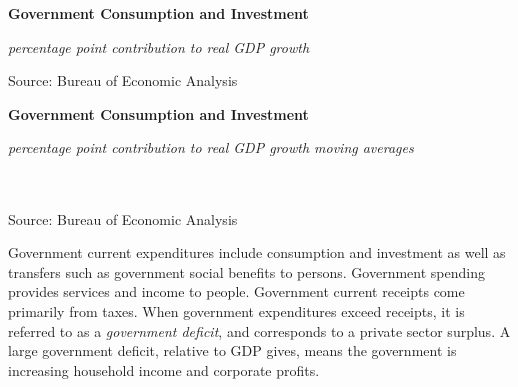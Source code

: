 \documentclass{report}
\makeatletter
\newcommand{\tbllink}[1]{\href{https://raw.githubusercontent.com/bdecon/US-chartbook/master/chartbook/data/#1}{\faTable}}
\newcommand*\short[1]{\expandafter\@gobbletwo\number\numexpr#1\relax}
\newcommand{\sbar}[4]{
		\addplot[ybar stacked, bar width=2.6pt, draw opacity=0, fill=#1] 
			table [x=#2, y=#3, col sep=comma]{#4};}
\newcommand{\dateaxisticks}{
		date coordinates in=x, axis line style={draw=none},
		xmax={2020-10-01},
		max space between ticks=40,	    
		xtick={{1990-01-01}, {1992-01-01}, {1994-01-01}, 
			{1996-01-01}, {1998-01-01}, {2000-01-01}, 
			{2002-01-01}, {2004-01-01}, {2006-01-01},
			{2008-01-01}, {2010-01-01}, {2012-01-01}, {2014-01-01},
		    {2016-01-01}, {2018-01-01}, {2020-01-01}},
		minor xtick={{1989-01-01}, {1991-01-01}, {1993-01-01},
			{1995-01-01}, {1997-01-01}, {1999-01-01}, 
			{2001-01-01}, {2003-01-01}, {2005-01-01}, {2007-01-01},
		    {2009-01-01}, {2011-01-01}, {2013-01-01}, {2015-01-01},
		    {2017-01-01}, {2019-01-01}},
		enlarge y limits={0.06}, enlarge x limits={0.01},
		}
\newcommand{\bbar}[2]{extra #1 ticks = {{#2}}, extra #1 tick labels = ,
		extra #1 tick style = {grid=major, grid style={thick, black!25}},}
\newcommand{\rbars}{
		\fill[color=black!10] (axis cs:{1990-07-01},\pgfkeysvalueof{/pgfplots/ymin}) rectangle 
			(axis cs:{1991-03-01}, \pgfkeysvalueof{/pgfplots/ymax});
		\fill[color=black!10] (axis cs:{2007-12-01},\pgfkeysvalueof{/pgfplots/ymin}) rectangle 
			(axis cs:{2009-07-01}, \pgfkeysvalueof{/pgfplots/ymax});
		\fill[color=black!10] (axis cs:{2001-03-01},\pgfkeysvalueof{/pgfplots/ymin}) rectangle 
			(axis cs:{2001-11-01}, \pgfkeysvalueof{/pgfplots/ymax});
		\fill[color=black!10] (axis cs:{2020-02-01},\pgfkeysvalueof{/pgfplots/ymin}) rectangle 
			(axis cs:{2020-10-01}, \pgfkeysvalueof{/pgfplots/ymax});}
\makeatother
\begin{document}
{{{{\begin{minipage}{0.76\textwidth}
\normalsize \textbf{Government Consumption and Investment}

\footnotesize{\textit{percentage point contribution to real GDP growth}}

\hspace*{-2mm} 

\footnotesize{Source: Bureau of Economic Analysis} \hfill \tbllink{gov.csv}

\end{minipage}
\vspace{6mm}

\noindent \normalsize \textbf{Government Consumption and Investment}\\
\footnotesize{\textit{percentage point contribution to real GDP growth \hspace{37mm} moving averages}\\ \vspace{4mm}
\noindent {} \setlength{\tabcolsep}{3.1pt} \color{black!90}
		{\renewcommand{\arraystretch}{1.55}
		 \begin{tabular}{p{42mm} R{6.7mm} R{6.7mm} R{6.7mm} R{6.7mm} R{6.7mm} 
		   R{7.8mm} R{6.7mm} R{6.7mm} }
			 \hline
		\end{tabular}
		}	\\
		
\vspace{-6mm}
\footnotesize{Source: Bureau of Economic Analysis}


\newpage

\begin{minipage}{0.76\textwidth}

\small Government current expenditures include consumption and investment as well as transfers such as government social benefits to persons. Government spending provides services and income to people. Government current receipts come primarily from taxes. When government expenditures exceed receipts, it is referred to as a \textit{government deficit}, and corresponds to a private sector surplus. A large government deficit, relative to GDP gives, means the government is increasing household income and corporate profits.\\


\end{minipage}}}}}}
\end{document}

